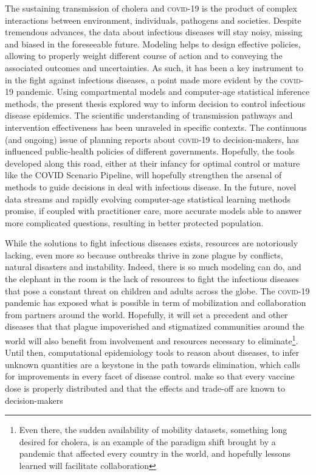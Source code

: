 The sustaining transmission of cholera and \textsc{covid}-19 is the product of complex interactions between environment, individuals, pathogens and societies. Despite tremendous advances, the data about infectious diseases will stay noisy, missing and biased in the foreseeable future. Modeling helps to design effective policies, allowing to properly weight different course of action and to conveying the associated outcomes and uncertainties. As such, it has been a key instrument to in the fight against infectious diseases, a point made more evident by the \textsc{covid}-19 pandemic. Using compartmental models and computer-age statistical inference methods, the present thesis explored way to inform decision to control infectious disease epidemics. The scientific understanding of transmission pathways and intervention effectiveness has been unraveled in specific contexts. The continuous (and ongoing) issue of planning reports about \textsc{covid}-19 to decision-makers, has influenced public-health policies of different governments. Hopefully, the tools developed along this road, either at their infancy for optimal control or mature like the COVID Scenario Pipeline, will hopefully strengthen the arsenal of methods to guide decisions in deal with infectious disease.  In the future, novel data streams and rapidly evolving computer-age statistical learning methods promise, if coupled with practitioner care, more accurate models able to answer more complicated questions, resulting in better protected population.

While the solutions to fight infectious diseases exists, resources are notoriously lacking, even more so because outbreaks thrive in zone plague by conflicts, natural disasters and instability. Indeed, there is so much modeling can do, and the elephant in the room is the lack of resources to fight the infectious diseases that pose a constant threat on children and adults across the globe. The \textsc{covid}-19 pandemic has exposed what is possible in term of mobilization and collaboration from partners around the world. Hopefully, it will set a precedent and other diseases that that plague impoverished and stigmatized communities around the world will also benefit from involvement and resources necessary to eliminate\footnote[][-2\baselineskip]{Even there, the sudden availability of mobility datasets, something long desired for cholera, is an example of the paradigm shift brought by a pandemic that affected every country in the world, and hopefully lessons learned will facilitate collaboration}. Until then, computational epidemiology tools to reason about diseases, to infer unknown quantities are a keystone in the path towards elimination, which calls for improvements in every facet of disease control. make so that every vaccine dose is properly distributed and that the effects and trade-off  are known to decision-makers


